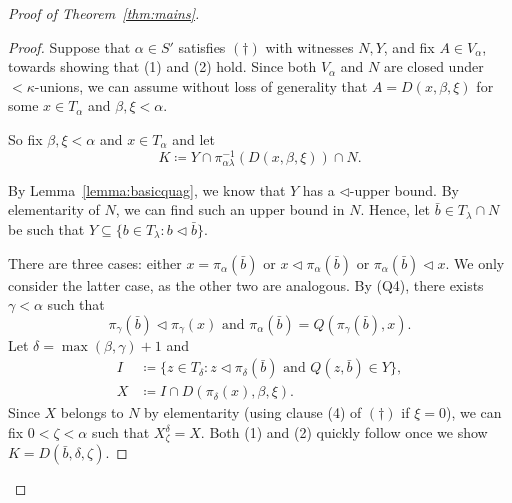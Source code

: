 \documentclass[]{amsart}
\theoremstyle{definition}
\theoremstyle{remark}
\begin{document}
\begin{proof}[Proof of Theorem~\ref{thm:mains}]
\begin{proof}
Suppose that $\alpha \in S'$ satisfies $(\dagger)$ with witnesses $N, Y$, and fix $A \in V_\alpha$, towards showing that (1) and (2) hold. Since both $V_\alpha$ and $N$ are closed under ${<}\kappa$-unions, we can assume without loss of generality that $A = D(x, \beta, \xi)$ for some $x \in T_\alpha$ and $\beta, \xi < \alpha$. 

So fix $\beta, \xi < \alpha$ and $x \in T_\alpha$ and  let 
\[
K \coloneqq Y \cap \pi_{\alpha \lambda}^{-1}(D(x, \beta, \xi)) \cap N.
\] 

By Lemma~\ref{lemma:basicquag}, we know that $Y$ has a $\lhd$-upper bound. By elementarity of $N$, we can find such an upper bound in $N$. Hence, let $\bar{b} \in T_{\lambda} \cap N$ be such that $Y \subseteq \{b \in T_{\lambda} : b \lhd \bar{b}\}$.

There are three cases: either $x = \pi_\alpha(\bar{b})$ or $x \lhd \pi_\alpha(\bar{b})$ or $\pi_\alpha(\bar{b}) \lhd x$. We only consider the latter case, as the other two are analogous.  By (Q4), there exists $\gamma < \alpha$ such that 
\[
\pi_\gamma(\bar{b}) \lhd \pi_\gamma(x) \text{ and } \pi_\alpha(\bar{b}) = Q(\pi_\gamma(\bar{b}),  x).
\]
Let $\delta = \max(\beta, \gamma) + 1$ and
\begin{align*}
I &\coloneqq \big\{z \in T_\delta : z \lhd \pi_\delta (\bar{b}) \text{ and } Q(z, \bar{b}) \in Y\big\},\\X &\coloneqq I \cap D(\pi_\delta(x), \beta, \xi).
\end{align*}
Since $X$ belongs to $N$ by elementarity (using clause (4) of $(\dagger)$ if $\xi = 0$), we can fix $0 < \zeta < \alpha$ such that $X^\delta_\zeta = X$. Both (1) and (2) quickly follow once we show $K = D(\bar{b}, \delta, \zeta)$.


\end{proof}
\end{proof}
\end{document}
